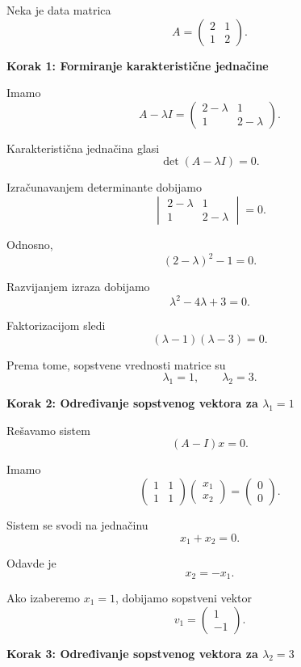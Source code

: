 \documentclass[12pt,a4paper]{report}
\begin{document}
Neka je data matrica
\[
A=
\begin{pmatrix}
	2 & 1\\
	1 & 2
\end{pmatrix}.
\]

\textbf{Korak 1: Formiranje karakteristične jednačine}

Imamo
\[
A-\lambda I=
\begin{pmatrix}
	2-\lambda & 1\\
	1 & 2-\lambda
\end{pmatrix}.
\]

Karakteristična jednačina glasi
\[
\det(A-\lambda I)=0.
\]

Izračunavanjem determinante dobijamo
\[
\begin{vmatrix}
	2-\lambda & 1\\
	1 & 2-\lambda
\end{vmatrix}=0.
\]

Odnosno,
\[
(2-\lambda)^2-1=0.
\]

Razvijanjem izraza dobijamo
\[
\lambda^2-4\lambda+3=0.
\]

Faktorizacijom sledi
\[
(\lambda-1)(\lambda-3)=0.
\]

Prema tome, sopstvene vrednosti matrice su
\[
\boxed{\lambda_1=1,\qquad \lambda_2=3.}
\]

\textbf{Korak 2: Određivanje sopstvenog vektora
	za $\lambda_1=1$}

Rešavamo sistem
\[
(A-I)x=0.
\]

Imamo
\[
\begin{pmatrix}
	1 & 1\\
	1 & 1
\end{pmatrix}
\begin{pmatrix}
	x_1\\
	x_2
\end{pmatrix}
=
\begin{pmatrix}
	0\\
	0
\end{pmatrix}.
\]

Sistem se svodi na jednačinu
\[
x_1+x_2=0.
\]

Odavde je
\[
x_2=-x_1.
\]

Ako izaberemo $x_1=1$, dobijamo sopstveni vektor
\[
\boxed{
	v_1=
	\begin{pmatrix}
		1\\
		-1
	\end{pmatrix}.
}
\]

\textbf{Korak 3: Određivanje sopstvenog vektora
	za $\lambda_2=3$}
\end{document}

